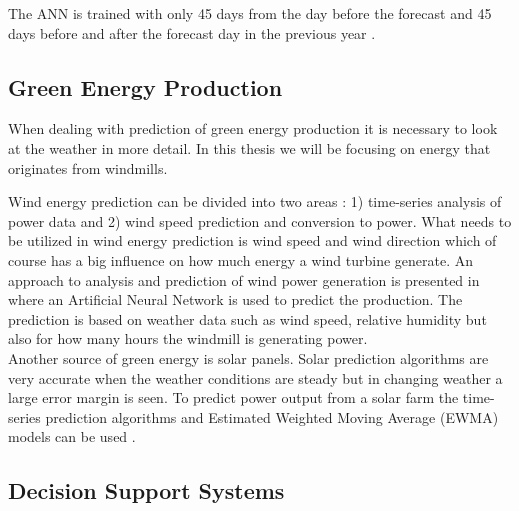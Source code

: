 \documentclass[twoside,11pt,openright]{report}
\begin{document}
The ANN is trained with only 45 days from the day before the forecast and 45 days before and after the forecast day in the previous year \cite{pjmForecast}.
 
\subsection{Green Energy Production}
When dealing with prediction of green energy production it is necessary to look at the weather in more detail. In this thesis we will be focusing on energy that originates from windmills. 

Wind energy prediction can be divided into two areas \cite{5}: 1) time-series analysis of power data and 2) wind speed prediction and conversion to power. What needs to be utilized in wind energy prediction is wind speed and wind direction which of course has a big influence on how much energy a wind turbine generate. An approach to analysis and prediction of wind power generation is presented in \cite{WindPowerGenerationUsingANN} where an Artificial Neural Network is used to predict the production. The prediction is based on weather data such as wind speed, relative humidity but also for how many hours the windmill is generating power. 
\\[0.5cm]
Another source of green energy is solar panels. Solar
prediction algorithms are very accurate when the weather conditions are steady but in changing weather a large error margin is seen. To predict power output from a solar farm the time-series prediction algorithms and Estimated Weighted Moving Average (EWMA) models can be used \cite{5}.


\subsection{Decision Support Systems}

\end{document}
